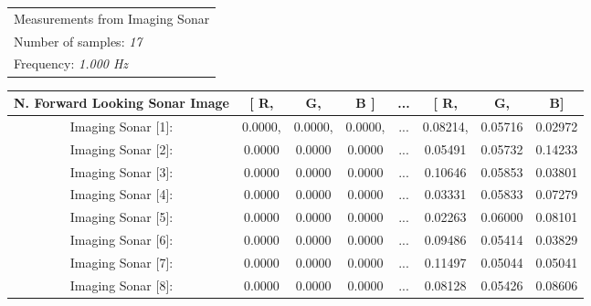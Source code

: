 \documentclass[]{article}
\begin{document}
	\begin{table}[H]
		\begin{flushleft}
			\begin{tabular}{l}
				\toprule 
				\small Measurements from Imaging Sonar \\
				\small Number of samples: \textit{17} \\
				\small Frequency: \textit{1.000 Hz} \\
			\end{tabular}
			
		\end{flushleft}
		\begin{center}
			\begin{tabular}{cccccccc}
				\toprule
				\small N. Forward Looking Sonar Image & \small [ R, &	\small G, &	\small B ] &	\small ... &	 \small [ R,  	&	\small G, &  \small B]\\
				\midrule
				\small Imaging Sonar [1]:& \small 0.0000,  &	\small 0.0000,&	\small 0.0000, &	\small ... & \small 0.08214, &	\small 0.05716 & \small 0.02972 \\
				
				\small Imaging Sonar [2]: & \small 0.0000 & \small 0.0000 & \small 0.0000 & \small ... & \small 0.05491 & \small 0.05732 & \small 0.14233 \\
				
				\small Imaging Sonar [3]: & \small 0.0000 & \small 0.0000 & \small 0.0000 & \small ... & \small 0.10646 & \small 0.05853 & \small 0.03801 \\
				
				\small Imaging Sonar [4]: & \small 0.0000 & \small 0.0000 & \small 0.0000 & \small ... & \small 0.03331 & \small 0.05833  & \small 0.07279 \\
				
				\small Imaging Sonar [5]: & \small 0.0000 & \small 0.0000 & \small 0.0000 & \small ... & \small 0.02263 & \small 0.06000 & \small 0.08101 \\
				
				\small Imaging Sonar [6]: & \small 0.0000 & \small 0.0000 & \small 0.0000 & \small ... & \small 0.09486 & \small 0.05414  & \small 0.03829 \\
				
				\small Imaging Sonar [7]: & \small 0.0000 & \small 0.0000 & \small 0.0000 & \small ... & \small 0.11497 & \small 0.05044 & \small 0.05041\\
				
				\small Imaging Sonar [8]: & \small 0.0000 & \small 0.0000 & \small 0.0000 & \small ... & \small 0.08128 & \small 0.05426  & \small 0.08606\\
				

\end{tabular}
\end{center}
\end{table}
\end{document}
